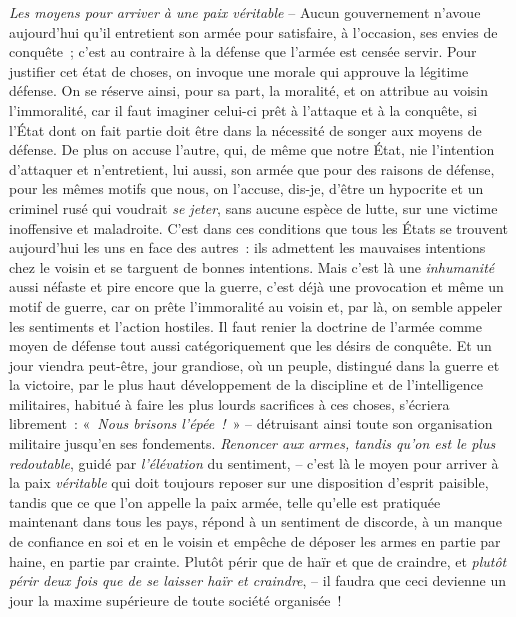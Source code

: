 	{\emph{Les moyens pour arriver à une paix véritable} – Aucun gouvernement n'avoue aujourd'hui qu'il entretient son armée pour satisfaire, à l'occasion, ses envies de conquête~; c'est au contraire à la défense que l'armée est censée servir. Pour justifier cet état de choses, on invoque une morale qui approuve la légitime défense. On se réserve ainsi, pour sa part, la moralité, et on attribue au voisin l'immoralité, car il faut imaginer celui-ci prêt à l'attaque et à la conquête, si l'État dont on fait partie doit être dans la nécessité de songer aux moyens de défense. De plus on accuse l'autre, qui, de même que notre État, nie l'intention d'attaquer et n'entretient, lui aussi, son armée que pour des raisons de défense, pour les mêmes motifs que nous, on l'accuse, dis-je, d'être un hypocrite et un criminel rusé qui voudrait \emph{se jeter}, sans aucune espèce de lutte, sur une victime inoffensive et maladroite. C'est dans ces conditions que tous les États se trouvent aujourd'hui les uns en face des autres~: ils admettent les mauvaises intentions chez le voisin et se targuent de bonnes intentions. Mais c'est là une \emph{inhumanité} aussi néfaste et pire encore que la guerre, c'est déjà une provocation et même un motif de guerre, car on prête l'immoralité au voisin et, par là, on semble appeler les sentiments et l'action hostiles. Il faut renier la doctrine de l'armée comme moyen de défense tout aussi catégoriquement que les désirs de conquête. Et un jour viendra peut-être, jour grandiose, où un peuple, distingué dans la guerre et la victoire, par le plus haut développement de la discipline et de l'intelligence militaires, habitué à faire les plus lourds sacrifices à ces choses, s'écriera librement~: «~\emph{Nous brisons l'épée~!}~» – détruisant ainsi toute son organisation militaire jusqu'en ses fondements. \emph{Renoncer aux armes, tandis qu'on est le plus redoutable}, guidé par \emph{l'élévation} du sentiment, – c'est là le moyen pour arriver à la paix \emph{véritable} qui doit toujours reposer sur une disposition d'esprit paisible, tandis que ce que l'on appelle la paix armée, telle qu'elle est pratiquée maintenant dans tous les pays, répond à un sentiment de discorde, à un manque de confiance en soi et en le voisin et empêche de déposer les armes en partie par haine, en partie par crainte. Plutôt périr que de haïr et que de craindre, et \emph{plutôt périr deux fois que de se laisser haïr et craindre}, – il faudra que ceci devienne un jour la maxime supérieure de toute société organisée~!
}
